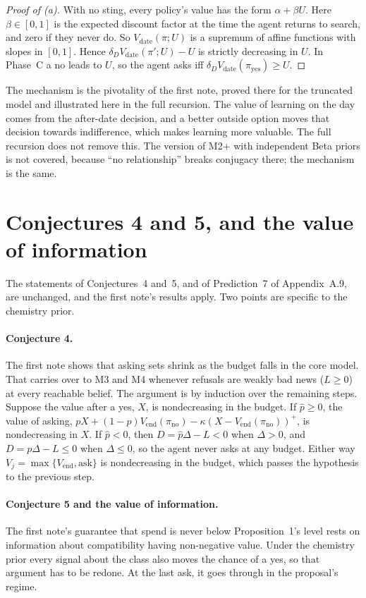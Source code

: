 \documentclass[11pt,a4paper]{article}
\theoremstyle{definition}
\theoremstyle{remark}
\newcommand{\Vend}{V_{\mathrm{end}}}
\newcommand{\pp}{\hat p}
\newcommand{\pn}{\pi_{\mathrm{no}}}
\begin{document}
\begin{proof}[Proof of (a)]
With no sting, every policy's value has the form $\alpha+\beta U$. Here $\beta\in[0,1]$ is the expected discount factor at the time the agent returns to search, and zero if they never do. So $V_{\mathrm{date}}(\pi;U)$ is a supremum of affine functions with slopes in $[0,1]$. Hence $\delta_DV_{\mathrm{date}}(\pi';U)-U$ is strictly decreasing in $U$. In Phase~C a no leads to $U$, so the agent asks iff $\delta_DV_{\mathrm{date}}(\pi_{\mathrm{yes}})\ge U$.
\end{proof}

The mechanism is the pivotality of the first note, proved there for the truncated model and illustrated here in the full recursion. The value of learning on the day comes from the after-date decision, and a better outside option moves that decision towards indifference, which makes learning more valuable. The full recursion does not remove this. The version of M2+ with independent Beta priors is not covered, because ``no relationship'' breaks conjugacy there; the mechanism is the same.

\section{Conjectures 4 and 5, and the value of information}\label{sec:c45}

The statements of Conjectures~4 and~5, and of Prediction~7 of Appendix~A.9, are unchanged, and the first note's results apply. Two points are specific to the chemistry prior.

\paragraph{Conjecture 4.} The first note shows that asking sets shrink as the budget falls in the core model. That carries over to M3 and M4 whenever refusals are weakly bad news ($L\ge0$) at every reachable belief. The argument is by induction over the remaining steps. Suppose the value after a yes, $X$, is nondecreasing in the budget. If $\pp\ge0$, the value of asking, $pX+(1-p)\Vend(\pn)-\kappa(X-\Vend(\pn))^+$, is nondecreasing in $X$. If $\pp<0$, then $D=\pp\Delta-L<0$ when $\Delta>0$, and $D=p\Delta-L\le0$ when $\Delta\le0$, so the agent never asks at any budget. Either way $V_j=\max\{\Vend,\text{ask}\}$ is nondecreasing in the budget, which passes the hypothesis to the previous step.

\paragraph{Conjecture 5 and the value of information.} The first note's guarantee that spend is never below Proposition~1's level rests on information about compatibility having non-negative value. Under the chemistry prior every signal about the class also moves the chance of a yes, so that argument has to be redone. At the last ask, it goes through in the proposal's regime.
\end{document}

